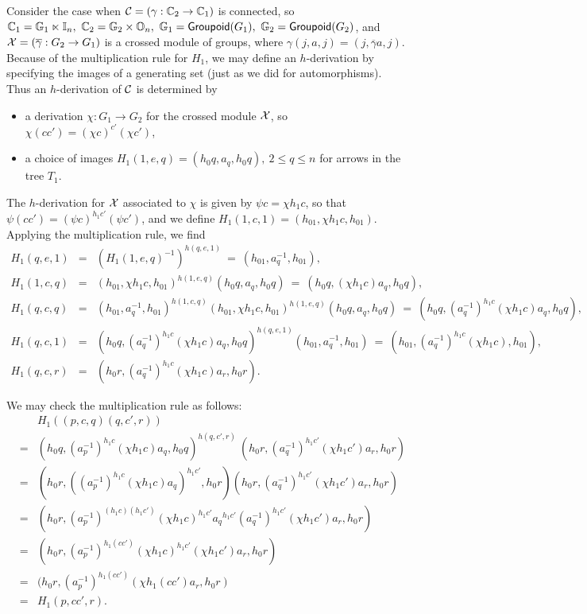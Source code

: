 \medskip
Consider the case when $\mathcal{C} = (\gamma : \mathbb{C}_2 \to \mathbb{C}_1)$ is connected, 
so $\mathbb{C}_1 = \mathbb{G}_1 \ltimes \mathbb{I}_n,~ \mathbb{C}_2 = \mathbb{G}_2 \times \mathbb{O}_n,~ 
\mathbb{G}_1 = {\sf Groupoid}(G_1),~ \mathbb{G}_2 = {\sf Groupoid}(G_2)$, and 
$\mathcal{X} = (\overline{\gamma} : G_2 \to G_1)$ is a crossed module of groups, 
where $\gamma(j,a,j) = (j,\overline{\gamma}a,j)$. 
Because of the multiplication rule for $H_1$, we may define an $h$-derivation 
by specifying the images of a generating set 
(just as we did for automorphisms).  
Thus an $h$-derivation of $\mathcal{C}$ is determined by 
\begin{itemize}
\item
a derivation $\chi : G_1 \to G_2$ for the crossed module $\mathcal{X}$, 
so $\chi(cc') = (\chi c)^{c'}(\chi c')$, 
\item
a choice of images $H_1(1,e,q) = (h_0q,a_q,h_0q),~ 2 \leqslant q \leqslant n$ 
for arrows in the tree $T_1$. 
\end{itemize}
The $h$-derivation for $\mathcal{X}$ associated to $\chi$ 
is given by $\psi c = \chi h_1 c$, 
so that $\psi(cc') = (\psi c)^{h_1 c'}(\psi c')$, 
and we define $H_1(1,c,1) = (h_01,\chi h_1 c, h_01)$. 
Applying the multiplication rule, we find 
\begin{eqnarray*}
H_1(q,e,1) &=& (H_1(1,e,q)^{-1})^{h(q,e,1)} 
               ~=~ (h_01,a_q^{-1},h_01), \\
H_1(1,c,q) &=& (h_01,\chi h_1c,h_01)^{h(1,e,q)}(h_0q,a_q,h_0q) 
               ~=~ (h_0q,(\chi h_1 c)a_q,h_0q), \\
H_1(q,c,q) &=& (h_01,a_q^{-1},h_01)^{h(1,c,q)}
                (h_01,\chi h_1c,h_01)^{h(1,e,q)}(h_0q,a_q,h_0q) 
               ~=~ (h_0q,(a_q^{-1})^{h_1c}(\chi h_1c)a_q,h_0q), \\
H_1(q,c,1) &=& (h_0q,(a_q^{-1})^{h_1c}(\chi h_1 c)a_q,h_0q)^{h(q,e,1)} 
                (h_01,a_q^{-1},h_01) 
               ~=~ (h_01,(a_q^{-1})^{h_1c}(\chi h_1c),h_01), \\
H_1(q,c,r) &=& (h_0r,(a_q^{-1})^{h_1c}(\chi h_1c)a_r,h_0r). 
\end{eqnarray*}

\medskip\noindent
We may check the multiplication rule as follows: 
\begin{eqnarray*}
 & &  H_1 \left( (p,c,q)(q,c',r) \right) \\
 &=&  (h_0q,(a_p^{-1})^{h_1c}(\chi h_1c)a_q,h_0q)^{h(q,c',r)}~
       (h_0r,(a_q^{-1})^{h_1c'}(\chi h_1c')a_r,h_0r) \\ 
 &=&  (h_0r,((a_p^{-1})^{h_1c}(\chi h_1c)a_q)^{h_1c'},h_0r) 
       (h_0r,(a_q^{-1})^{h_1c'}(\chi h_1c')a_r,h_0r) \\ 
 &=&  (h_0r,(a_p^{-1})^{(h_1c)(h_1c')}(\chi h_1c)^{h_1c'}{a_q}^{h_1c'} 
             (a_q^{-1})^{h_1c'}(\chi h_1c')a_r,h_0r) \\ 
 &=&  (h_0r,(a_p^{-1})^{h_1(cc')}(\chi h_1c)^{h_1c'}(\chi h_1c')a_r,h_0r) \\ 
 &=&  (h_0r,(a_p^{-1})^{h_1(cc')}(\chi h_1(cc')a_r,h_0r) \\ 
 &=&  H_1(p,cc',r).
\end{eqnarray*}



